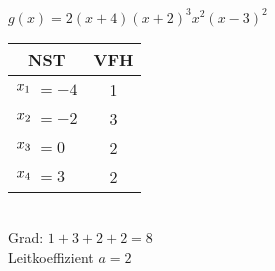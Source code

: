 \begin{minipage}{0.47\textwidth}\raggedright
	\(g(x)=2\left(x+4\right)\left(x+2\right)^3x^2\left(x-3\right)^2\)\\ \vspace{0.3cm}
	\begin{minipage}{0.8\linewidth}
		\begin{tabular}{rlc}
			\multicolumn{2}{c}{NST}&VFH\\
			\midrule
			\(x_1\hspace{-0.3cm}\)&\(=-4\)&1\\
			\(x_2\hspace{-0.3cm}\)&\(=-2\)&3\\
			\(x_3\hspace{-0.3cm}\)&\(=0\)&2\\
			\(x_4\hspace{-0.3cm}\)&\(=3\)&2
		\end{tabular}
	\end{minipage}\\
	Grad: \(1+3+2+2=8\)\\
	Leitkoeffizient \(a=2\)\\
\end{minipage}\\ \vspace{1cm}

